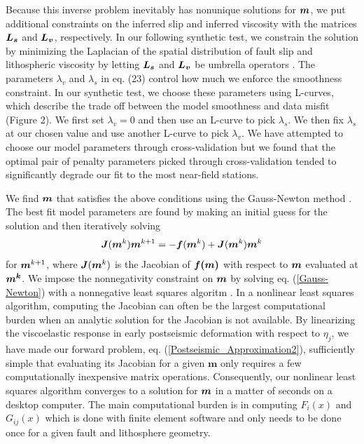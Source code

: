 \documentclass[extra]{gji}
\begin{document}
Because this inverse problem inevitably has nonunique solutions for
$\mitbf{m}$, we put additional constraints on the inferred slip and
inferred viscosity with the matrices $\mitbf{L_s}$ and $\mitbf{L_v}$,
respectively.  In our following synthetic test, we constrain the
solution by minimizing the Laplacian of the spatial distribution of
fault slip and lithospheric viscosity by letting
$\mitbf{L_s}$ and $\mitbf{L_v}$ be umbrella operators \citep{D1999}.
The parameters $\lambda_v$ and $\lambda_s$ in eq. (23) control how
much we enforce the smoothness constraint.  In our synthetic test, we
choose these parameters using L-curves, which describe the trade off
between the model smoothness and data misfit (Figure 2).  We first set
$\lambda_v=0$ and then use an L-curve to pick $\lambda_s$.  We then
fix $\lambda_s$ at our chosen value and use another L-curve to pick
$\lambda_v$.  We have attempted to choose our model parameters through
cross-validation but we found that the optimal pair of penalty
parameters picked through cross-validation tended to significantly
degrade our fit to the most near-field stations.

We find $\mitbf{m}$ that satisfies the above conditions using the
Gauss-Newton method \citep[e.g.][]{A2013}.  The best fit model parameters are
found by making an initial guess for the solution and then iteratively
solving
\begin{equation}\label{Gauss-Newton}
\mitbf{J}(\mitbf{m}^{k})\mitbf{m}^{k+1} = -\mitbf{f}(\mitbf{m}^k) + \mitbf{J}(\mitbf{m}^{k})\mitbf{m}^{k}
\end{equation}
for $\mitbf{m}^{k+1}$, where $\mitbf{J}(\mitbf{m}^k)$ is the Jacobian
of $\mitbf{f(m)}$ with respect to $\mitbf{m}$ evaluated at
$\mitbf{m^k}$. We impose the nonnegativity constraint on $\mitbf{m}$
by solving eq. (\ref{Gauss-Newton}) with a nonnegative least squares
algoritm \citep{LH1974}. In a nonlinear least squares algorithm,
computing the Jacobian can often be the largest computational burden
when an analytic solution for the Jacobian is not available. By
linearizing the viscoelastic response in early postseismic deformation
with respect to $\eta_j$, we have made our forward problem,
eq. (\ref{Postseismic_Approximation2}), sufficiently simple that
evaluating its Jacobian for a given $\mathbf{m}$ only requires a few
computationally inexpensive matrix operations. Consequently, our
nonlinear least squares algorithm converges to a solution for
$\mitbf{m}$ in a matter of seconds on a desktop computer.  The main
computational burden is in computing $F_i(x)$ and $G_{ij}(x)$ which is
done with finite element software and only needs to be done once for a
given fault and lithosphere geometry.
\end{document}
